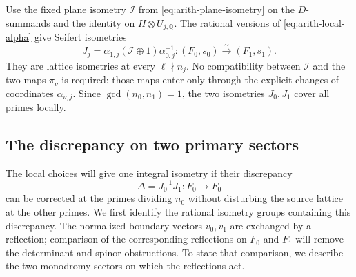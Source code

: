 Use the fixed plane isometry $\mathcal I$ from
\eqref{eq:arith-plane-isometry} on the $D$-summands and the identity
on $H\otimes U_{j,\mathbb Q}$.  The rational versions of
\eqref{eq:arith-local-alpha} give Seifert isometries
\begin{equation}\label{eq:arith-two-J}
 J_j=\alpha_{1,j}(\mathcal I\oplus1)\alpha_{0,j}^{-1}
 \colon(F_0,s_0)\xrightarrow{\ \sim\ }(F_1,s_1).
\end{equation}
They are lattice isometries at every $\ell\nmid n_j$.  No compatibility
between $\mathcal I$ and the two maps $\pi_\nu$ is required: those maps enter
only through the explicit changes of coordinates $\alpha_{\nu,j}$.
Since $\gcd(n_0,n_1)=1$, the two isometries $J_0,J_1$
cover all primes locally.

\subsection{The discrepancy on two primary sectors}
\label{subsec:arith-correction}

The local choices will give one integral isometry if their discrepancy
\[
 \Delta=J_0^{-1}J_1\colon F_0\longrightarrow F_0
\]
can be corrected at the primes dividing $n_0$ without disturbing the
source lattice at the other primes. We first identify the rational
isometry groups containing this discrepancy. The normalized boundary
vectors $v_0,v_1$ are exchanged by a reflection; comparison of the corresponding
reflections on $F_0$ and $F_1$ will remove the determinant and spinor
obstructions. To state that comparison, we describe the two monodromy
sectors on which the reflections act.

